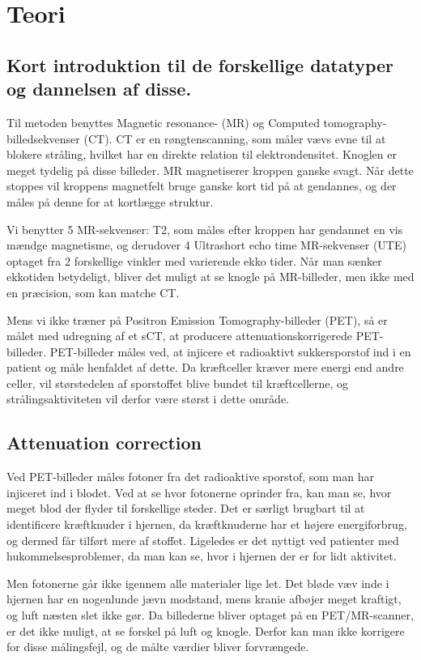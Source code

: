 \section{Teori}
\subsection{Kort introduktion til de forskellige datatyper og dannelsen af disse.}


Til metoden benyttes Magnetic resonance- (MR) og Computed
tomo\-graphy-billedsekvenser (CT). CT er en røngtenscanning, som måler
vævs evne til at blokere stråling, hvilket har en direkte relation
til elektrondensitet. Knoglen er meget tydelig på disse billeder. MR
magnetiserer kroppen ganske svagt. Når dette stoppes vil kroppens
magnetfelt bruge ganske kort tid på at gendannes, og der måles på
denne for at kortlægge struktur.

Vi benytter 5 MR-sekvenser: T2, som måles efter kroppen har gendannet en vis
mændge magnetisme, og derudover 4 Ultrashort echo time MR-sekvenser (UTE)
optaget fra 2 forskellige vinkler med varierende ekko tider. Når man sænker ekkotiden betydeligt, bliver det muligt at se knogle på MR-billeder, men ikke med
en præcision, som kan matche CT.

Mens vi ikke træner på Positron Emission Tomography-billeder (PET), så
er målet med udregning af et sCT, at producere attenuationskorrigerede
PET-billeder. PET-billeder måles ved, at injicere et radioaktivt
sukkersporstof ind i en patient og måle henfaldet af dette. Da
kræftceller kræver mere energi end andre celler, vil størstedelen af
sporstoffet blive bundet til kræftcellerne, og strålingsaktiviteten
vil derfor være størst i dette område.

\subsection{Attenuation correction} 

Ved PET-billeder måles fotoner fra det radioaktive sporstof, som man
har injiceret ind i blodet. Ved at se hvor fotonerne oprinder fra, kan
man se, hvor meget blod der flyder til forskellige steder. Det er særligt
brugbart til at identificere kræftknuder i hjernen, da kræftknuderne har
et højere energiforbrug, og dermed får tilført mere af stoffet. Ligeledes er det nyttigt ved patienter med
hukommelsesproblemer, da man kan se, hvor i hjernen der er for lidt
aktivitet.

Men fotonerne går ikke igennem alle materialer lige let. Det bløde væv
inde i hjernen har en nogenlunde jævn modstand, mens kranie afbøjer
meget kraftigt, og luft næsten slet ikke gør. Da billederne bliver
optaget på en PET/MR-scanner, er det ikke muligt, at se forskel på luft
og knogle. Derfor kan man ikke korrigere for disse målingsfejl, og de
målte værdier bliver forvrængede.

